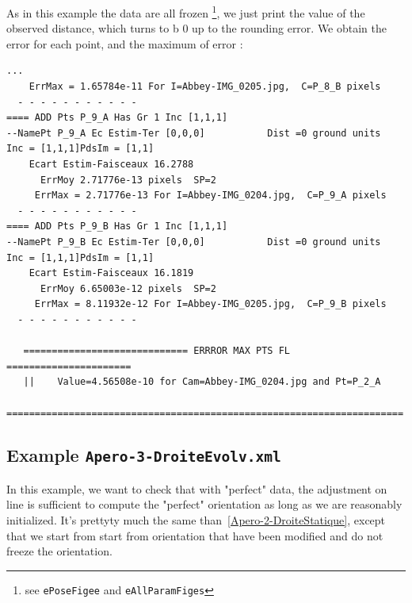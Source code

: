 As in this example the data are all frozen \footnote{see {\tt ePoseFigee} and {\tt eAllParamFiges}}, we just print the
value of the observed distance, which turns to b $0$ up to the rounding error. We obtain the error for each point, and 
the maximum of error :


\begin{verbatim}
...
    ErrMax = 1.65784e-11 For I=Abbey-IMG_0205.jpg,  C=P_8_B pixels 
  - - - - - - - - - - - 
==== ADD Pts P_9_A Has Gr 1 Inc [1,1,1]
--NamePt P_9_A Ec Estim-Ter [0,0,0]           Dist =0 ground units
Inc = [1,1,1]PdsIm = [1,1]
    Ecart Estim-Faisceaux 16.2788
      ErrMoy 2.71776e-13 pixels  SP=2 
     ErrMax = 2.71776e-13 For I=Abbey-IMG_0204.jpg,  C=P_9_A pixels 
  - - - - - - - - - - - 
==== ADD Pts P_9_B Has Gr 1 Inc [1,1,1]
--NamePt P_9_B Ec Estim-Ter [0,0,0]           Dist =0 ground units
Inc = [1,1,1]PdsIm = [1,1]
    Ecart Estim-Faisceaux 16.1819
      ErrMoy 6.65003e-12 pixels  SP=2 
     ErrMax = 8.11932e-12 For I=Abbey-IMG_0205.jpg,  C=P_9_B pixels 
  - - - - - - - - - - - 

   ============================= ERRROR MAX PTS FL ======================
   ||    Value=4.56508e-10 for Cam=Abbey-IMG_0204.jpg and Pt=P_2_A
   ======================================================================
\end{verbatim}


\subsection{Example {\tt Apero-3-DroiteEvolv.xml}}

In this example, we  want to check that with "perfect" data, the adjustment on line
is sufficient to compute the "perfect" orientation as long as we are reasonably initialized.
It's prettyty much the same than~\ref{Apero-2-DroiteStatique},
except that we start from start from orientation that have been modified and
do not freeze the orientation.


